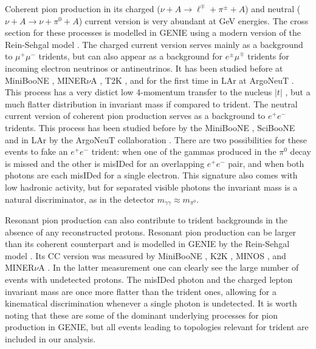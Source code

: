 Coherent pion production in its charged ($\nu + A \to \ell^\mp + \pi^\pm + A$) and neutral ($\nu + A \to \nu + \pi^0 + A$) current version is very abundant at GeV energies. The cross section for these processes is modelled in GENIE using a modern version of the Rein-Sehgal model \cite{REIN198329,Rein:2006di}. The charged current version serves mainly as a background to $\mu^+ \mu^-$ tridents, but can also appear as a background for $e^\pm \mu^\mp$ tridents for incoming electron neutrinos or antineutrinos. It has been studied before at MiniBooNE \cite{AguilarArevalo:2010xt}, MINER$\nu$A \cite{Higuera:2014azj,Mislivec:2017qfz}, T2K \cite{Abe:2016fic,Abe:2016aoo}, and for the first time in LAr at ArgoNeuT \cite{Acciarri:2014eit}. This process has a very distict low 4-momentum transfer to the nucleus $|t|$ \cite{Higuera:2014azj}, but a much flatter distribution in invariant mass if compared to trident. The neutral current version of coherent pion production serves as a background to $e^+e^-$ tridents. This process has been studied before by the MiniBooNE \cite{AguilarArevalo:2009ww}, SciBooNE \cite{Kurimoto:2010rc} and in LAr by the ArgoNeuT collaboration \cite{Acciarri:2015ncl}. There are two possibilities for these events to fake an $e^+e^-$ trident: when one of the gammas produced in the $\pi^0$ decay is missed and the other is misIDed for an overlapping $e^+e^-$ pair, and when both photons are each misIDed for a single electron. This signature also comes with low hadronic activity, but for separated visible photons the invariant mass is a natural discriminator, as in the detector $m_{\gamma \gamma} \approx m_{\pi^0}$.

Resonant pion production can also contribute to trident backgrounds in the absence of any reconstructed protons. Resonant pion production can be larger than its coherent counterpart and is modelled in GENIE by the Rein-Sehgal model \cite{Rein:1980wg}. Its CC version was measured by MiniBooNE \cite{AguilarArevalo:2010xt}, K2K \cite{Mariani:2010ez}, MINOS \cite{Adamson:2014pgc}, and MINER$\nu$A \cite{Altinok:2017xua}. In the latter measurement one can clearly see the large number of events with undetected protons. The misIDed photon and the charged lepton invariant mass are once more flatter than the trident ones, allowing for a kinematical discrimination whenever a single photon is undetected. It is worth noting that these are some of the dominant underlying processes for pion production in GENIE, but all events leading to topologies relevant for trident are included in our analysis.
%
